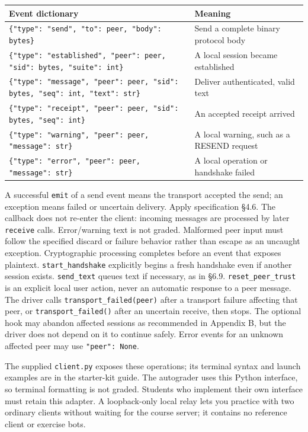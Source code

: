 \documentclass[11pt]{article}
\begin{document}
\begin{center}\small
\begin{tabular}{p{3.12in}p{2.13in}}
\toprule
\textbf{Event dictionary} & \textbf{Meaning} \\
\midrule
\texttt{\{"type": "send", "to": peer, "body": bytes\}} & Send a complete binary protocol body \\
\texttt{\{"type": "established", "peer": peer, "sid": bytes, "suite": int\}} & A local session became established \\
\texttt{\{"type": "message", "peer": peer, "sid": bytes, "seq": int, "text": str\}} & Deliver authenticated, valid text \\
\texttt{\{"type": "receipt", "peer": peer, "sid": bytes, "seq": int\}} & An accepted receipt arrived \\
\texttt{\{"type": "warning", "peer": peer, "message": str\}} & A local warning, such as a RESEND request \\
\texttt{\{"type": "error", "peer": peer, "message": str\}} & A local operation or handshake failed \\
\bottomrule
\end{tabular}
\end{center}

A successful \texttt{emit} of a send event means the transport accepted the send; an exception means failed or uncertain delivery. Apply specification \S{}4.6. The callback does not re-enter the client: incoming messages are processed by later \texttt{receive} calls. Error/warning text is not graded. Malformed peer input must follow the specified discard or failure behavior rather than escape as an uncaught exception. Cryptographic processing completes before an event that exposes plaintext. \texttt{start\_handshake} explicitly begins a fresh handshake even if another session exists. \texttt{send\_text} queues text if necessary, as in \S{}6.9. \texttt{reset\_peer\_trust} is an explicit local user action, never an automatic response to a peer message. The driver calls \texttt{transport\_failed(peer)} after a transport failure affecting that peer, or \texttt{transport\_failed()} after an uncertain receive, then stops. The optional hook may abandon affected sessions as recommended in Appendix B, but the driver does not depend on it to continue safely. Error events for an unknown affected peer may use \texttt{"peer": None}.

The supplied \texttt{client.py} exposes these operations; its terminal syntax and launch examples are in the starter-kit guide. The autograder uses this Python interface, so terminal formatting is not graded. Students who implement their own interface must retain this adapter. A loopback-only local relay lets you practice with two ordinary clients without waiting for the course server; it contains no reference client or exercise bots.
\end{document}
